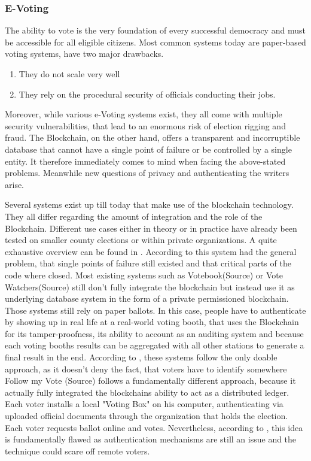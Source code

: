 \subsubsection{E-Voting}
The ability to vote is the very foundation of every successful democracy and must be accessible for all eligible citizens. Most common systems today are paper-based voting systems, have two major drawbacks.
\begin{enumerate}
	\item They do not scale very well
	\item They rely on the procedural security of officials conducting their jobs.
\end{enumerate}

Moreover, while various e-Voting systems exist, they all come with multiple security vulnerabilities, that lead to an enormous risk of election rigging and fraud.
The Blockchain, on the other hand, offers a transparent and incorruptible database that cannot have a single point of failure or be controlled by a single entity. It therefore immediately comes to mind when facing the above-stated problems. Meanwhile new questions of privacy and authenticating the writers arise.

Several systems exist up till today that make use of the blockchain technology. They all differ regarding the amount of integration and the role of the Blockchain. Different use cases either in theory or in practice have already been tested on smaller county elections or within private organizations. A quite exhaustive overview can be found in \cite{BenAyed2017}. According to \citeauthor{BenAyed2017} this system had the general problem, that single points of failure still existed and that critical parts of the code where closed.
Most existing systems such as Votebook(Source) or Vote Watchers(Source) still don't fully integrate the blockchain but instead use it as underlying database system in the form of a private permissioned blockchain. Those systems still rely on paper ballots. In this case, people have to authenticate by showing up in real life at a real-world voting booth, that uses the Blockchain for its tamper-proofness, its ability to account as an auditing system and because each voting booths results can be aggregated with all other stations to generate a final result in the end.
According to \citeauthor{Osgood2016}, these systems follow the only doable approach, as it doesn't deny the fact, that voters have to identify somewhere
Follow my Vote (Source) follows a fundamentally different approach, because it actually fully integrated the blockchains ability to act as a distributed ledger. Each voter installs a local "Voting Box" on his computer, authenticating via uploaded official documents through the organization that holds the election. Each voter requests ballot online and votes. Nevertheless, according to \citeauthor{Osgood2016}, this idea is fundamentally flawed as authentication mechanisms are still an issue and the technique could scare off remote voters.


